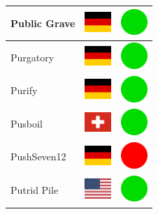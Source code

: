 \documentclass[12pt, a4paper, twoside]{report}
\begin{document}
\begin{center}
\begin{longtable}{|p{5cm}|p{2cm}|p{2cm}|}
 Public Grave                                               & \includegraphics[width=1cm]{../4x3/de} &   \includegraphics[width=1cm]{../likes/y} \\ \hline
 Purgatory                                                  & \includegraphics[width=1cm]{../4x3/de} &   \includegraphics[width=1cm]{../likes/y} \\ \hline
 Purify                                                     & \includegraphics[width=1cm]{../4x3/de} &   \includegraphics[width=1cm]{../likes/y} \\ \hline
 Pusboil                                                    & \includegraphics[width=1cm]{../4x3/ch} &   \includegraphics[width=1cm]{../likes/y} \\ \hline
 PushSeven12                                                & \includegraphics[width=1cm]{../4x3/de} &   \includegraphics[width=1cm]{../likes/n} \\ \hline
 Putrid Pile                                                & \includegraphics[width=1cm]{../4x3/us} &   \includegraphics[width=1cm]{../likes/y} \\ \hline

\end{longtable}
\end{center}
\end{document}
